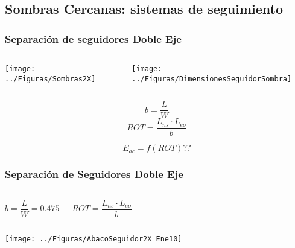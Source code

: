 \documentclass[serif, xcolor=dvipsnames]{beamer}
\begin{document}
\subsection{Sombras Cercanas: sistemas de seguimiento}


\begin{frame}
  \frametitle{Separación de seguidores Doble Eje}
  \begin{columns}%


    \column{7cm}

    \begin{center}
      \texttt{[image: ../Figuras/Sombras2X]}
      \par\end{center}


    \column{3cm}

    \begin{center}
      \texttt{[image: ../Figuras/DimensionesSeguidorSombra]}
      \par\end{center}

  \end{columns}%
  \[
  b=\frac{L}{W}\]
  \[
  ROT=\frac{L_{ns}\cdot L_{eo}}{b}\]


  {\large \[ E_{ac}=f(ROT)??\] }{\large \par}

\end{frame}


\begin{frame}[plain]
\frametitle{Separación de Seguidores Doble Eje}
\begin{columns}[t]%


\column{4cm}

{\footnotesize \[
b=\frac{L}{W}=0.475\]
}{\footnotesize \par}


\column{4cm}

{\footnotesize \[
ROT=\frac{L_{ns}\cdot L_{eo}}{b}\]
}{\footnotesize \par}

\end{columns}%
\begin{center}
\texttt{[image: ../Figuras/AbacoSeguidor2X\_Ene10]}
\par\end{center}


\end{frame}
\end{document}

